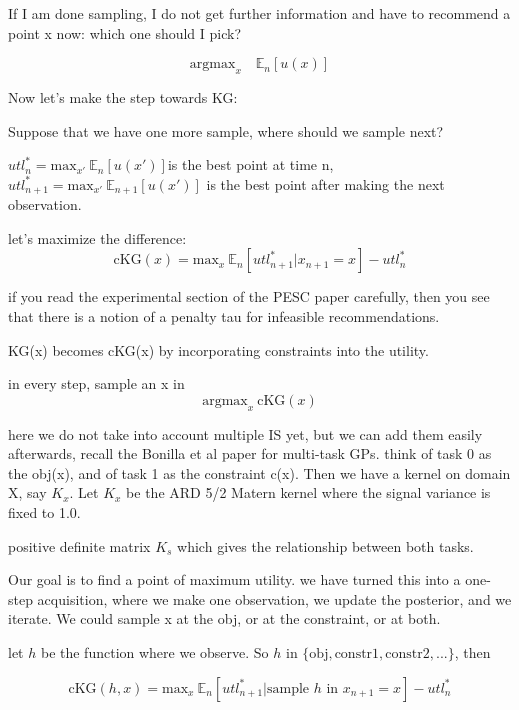 \documentclass[12pt]{article}
\begin{document}
If I am done sampling, I do not get further information and have to recommend a point x now: which one should I pick?

\begin{equation*}
\text{argmax}_x\quad \mathbb{E}_n[ u(x) ]
\end{equation*}

Now let's make the step towards KG:

Suppose that we have one more sample, where should we sample next?

$utl_n^* = \text{max}_{x'}\ \mathbb{E}_n[u(x')] $is the best point at time n, $utl_{n+1}^*=\text{max}_{x'}\ \mathbb{E}_{n+1}[u(x')]$ is the best point after making the next observation.

let's maximize the difference:
\begin{equation*}
\text{cKG}(x) = \text{max}_x\ \mathbb{E}_n[utl_{n+1}^*|x_{n+1} = x] - utl_n^*
\end{equation*}

if you read the experimental section of the PESC paper carefully, then you see that there is a notion of a penalty tau for infeasible recommendations.

KG(x) becomes cKG(x) by incorporating constraints into the utility.

in every step, sample an x in 
$$\text{argmax}_x\ \text{cKG}(x)$$

here we do not take into account multiple IS yet, but we can add them easily afterwards, recall the Bonilla et al paper for multi-task GPs. think of task 0 as the obj(x), and of task 1 as the constraint c(x). Then we have a kernel on domain X, say $K_x$. Let $K_x$ be the ARD 5/2 Matern kernel where the signal variance is fixed to 1.0.

positive definite matrix $K_s$ which gives the relationship between both tasks.

Our goal is to find a point of maximum utility. we have turned this into a one-step acquisition, where we make one observation, we update the posterior, and we iterate. We could sample x at the obj, or at the constraint, or at both.

let $h$ be the function where we observe.
So $h$ in $\{\text{obj}, \text{constr1}, \text{constr2},...\}$, then

\begin{equation*}
\text{cKG}(h,x) = \text{max}_x\ \mathbb{E}_n[utl_{n+1}^*|\text{sample $h$ in }x_{n+1} = x] - utl_n^*
\end{equation*}
\end{document}
